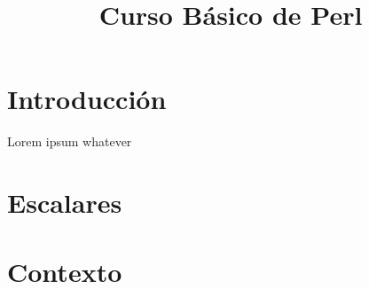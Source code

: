\documentclass{book}
\title{Curso Básico de Perl}
\begin{document}
\chapter{Introducción}

Lorem ipsum whatever

\chapter{Escalares}
\chapter{Contexto}
\end{document}
